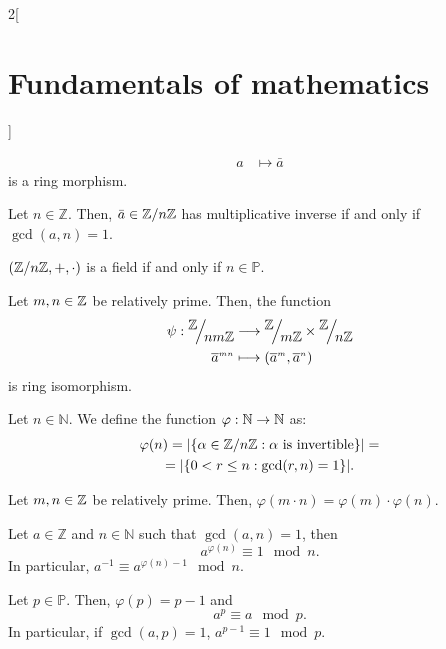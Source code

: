 \documentclass[../../../main.tex]{subfiles}
\begin{document}
\begin{multicols}{2}[\section{Fundamentals of mathematics}]
\begin{theorem}
\begin{align*}
            a            & \longmapsto\bar{a}
        \end{align*}
        is a ring morphism.
    \end{theorem}
    \begin{lemma}
        Let $n\in\mathbb{Z}$. Then, $\bar{a}\in\quot{\ZZ}{n\ZZ}$ has multiplicative inverse if and only if $\gcd(a,n)=1$.
    \end{lemma}
    \begin{corollary}
        $(\quot{\ZZ}{n\ZZ},+,\cdot)$ is a field if and only if $n\in\mathbb{P}$.
    \end{corollary}
    \begin{theorem}
        Let $m,n\in\mathbb{Z}$ be relatively prime. Then, the function
        \begin{align*}
            \psi:\quot{\ZZ}{nm\ZZ}               & \longrightarrow\quot{\ZZ}{m\ZZ}\times\quot{\ZZ}{n\ZZ}                                \\
            \overline{a}^{\scriptscriptstyle mn} & \longmapsto(\overline{a}^{\scriptscriptstyle m},\overline{a}^{\scriptscriptstyle n})
        \end{align*}
        is ring isomorphism.
    \end{theorem}
    \begin{definition}
        Let $n\in\mathbb{N}$. We define the function $\varphi:\mathbb{N}\rightarrow\mathbb{N}$ as:
        \begin{multline*}
            \varphi(n)=|\{\textstyle\alpha\in\quot{\ZZ}{n\ZZ}:\alpha \text{ is invertible}\}|=\\=|\{0<r\leq n: \gcd(r,n)=1\}|.
        \end{multline*}
    \end{definition}
    \begin{lemma}
        Let $m,n\in\mathbb{Z}$ be relatively prime. Then, $\varphi(m\cdot n)=\varphi(m)\cdot\varphi(n).$
    \end{lemma}
    \begin{theorem}
        Let $a\in\mathbb{Z}$ and $n\in\mathbb{N}$ such that $\gcd(a,n)=1$, then $$a^{\varphi(n)}\equiv 1\mod n.$$ In particular, $a^{-1}\equiv a^{\varphi(n)-1}\mod n$.
    \end{theorem}
    \begin{theorem}
        Let $p\in\mathbb{P}$. Then, $\varphi(p)=p-1$ and $$a^p\equiv a\mod p.$$ In particular, if $\gcd(a,p)=1$, $a^{p-1}\equiv 1\mod p$.
    \end{theorem}

\end{multicols}
\end{document}

